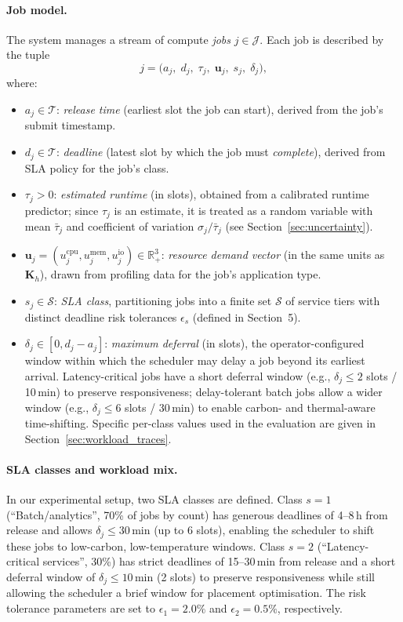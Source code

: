 \documentclass[a4paper,fleqn]{cas-dc}
\begin{document}
\paragraph{Job model.}
The system manages a stream of compute \emph{jobs} $j \in \mathcal{J}$. Each job is described by the tuple
\begin{equation}
j = \bigl(a_j,\; d_j,\; \tau_j,\; \mathbf{u}_j,\; s_j,\; \delta_j\bigr),
\end{equation}
where:
\begin{itemize}
  \item $a_j \in \mathcal{T}$: \emph{release time} (earliest slot the job can start), derived from the job's submit timestamp.
  \item $d_j \in \mathcal{T}$: \emph{deadline} (latest slot by which the job must \emph{complete}), derived from SLA policy for the job's class.
  \item $\tau_j > 0$: \emph{estimated runtime} (in slots), obtained from a calibrated runtime predictor; since $\tau_j$ is an estimate, it is treated as a random variable with mean $\bar{\tau}_j$ and coefficient of variation $\sigma_j / \bar{\tau}_j$ (see Section~\ref{sec:uncertainty}).
  \item $\mathbf{u}_j = (u^{\mathrm{cpu}}_j, u^{\mathrm{mem}}_j, u^{\mathrm{io}}_j) \in \mathbb{R}^{3}_{+}$: \emph{resource demand vector} (in the same units as $\mathbf{K}_h$), drawn from profiling data for the job's application type.
  \item $s_j \in \mathcal{S}$: \emph{SLA class}, partitioning jobs into a finite set $\mathcal{S}$ of service tiers with distinct deadline risk tolerances $\epsilon_s$ (defined in Section~5).
  \item $\delta_j \in [0, d_j - a_j]$: \emph{maximum deferral} (in slots), the operator-configured window within which the scheduler may delay a job beyond its earliest arrival. Latency-critical jobs have a short deferral window (e.g., $\delta_j \leq 2$ slots / 10\,min) to preserve responsiveness; delay-tolerant batch jobs allow a wider window (e.g., $\delta_j \leq 6$ slots / 30\,min) to enable carbon- and thermal-aware time-shifting. Specific per-class values used in the evaluation are given in Section~\ref{sec:workload_traces}.
\end{itemize}

\paragraph{SLA classes and workload mix.}
In our experimental setup, two SLA classes are defined. Class $s=1$ (``Batch/\allowbreak analytics'', 70\% of jobs by count) has generous deadlines of 4--8\,h from release and allows $\delta_j \leq 30$\,min (up to 6 slots), enabling the scheduler to shift these jobs to low-carbon, low-temperature windows. Class $s=2$ (``Latency-critical services'', 30\%) has strict deadlines of 15--30\,min from release and a short deferral window of $\delta_j \leq 10$\,min (2 slots) to preserve responsiveness while still allowing the scheduler a brief window for placement optimisation. The risk tolerance parameters are set to $\epsilon_1 = 2.0\%$ and $\epsilon_2 = 0.5\%$, respectively.
\end{document}

